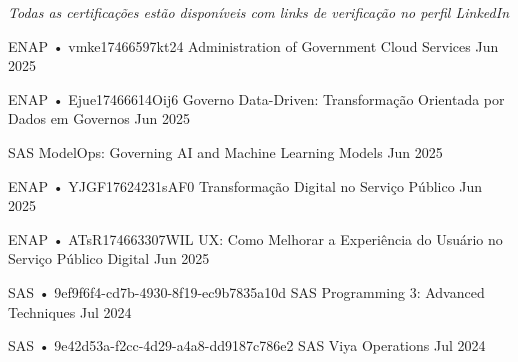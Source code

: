 
\textit{ \small Todas as certificações estão disponíveis com links de verificação no perfil LinkedIn}


\begin{cventries}

  \cventry
    {ENAP • vmke17466597kt24} %
    {Administration of Government Cloud Services} %
    {} %
    {Jun 2025} %
    {}

  \cventry
    {ENAP • Ejue17466614Oij6} %
    {Governo Data-Driven: Transformação Orientada por Dados em Governos} %
    {} %
    {Jun 2025} %
    {}

  \cventry
    {SAS} %
    {ModelOps: Governing AI and Machine Learning Models} %
    {} %
    {Jun 2025} %
    {}

  \cventry
    {ENAP • YJGF17624231sAF0} %
    {Transformação Digital no Serviço Público} %
    {} %
    {Jun 2025} %
    {}

  \cventry
    {ENAP • ATsR174663307WIL} %
    {UX: Como Melhorar a Experiência do Usuário no Serviço Público Digital} %
    {} %
    {Jun 2025} %
    {}

  \cventry
    {SAS • 9ef9f6f4-cd7b-4930-8f19-ec9b7835a10d} %
    {SAS Programming 3: Advanced Techniques} %
    {} %
    {Jul 2024} %
    {}

  \cventry
    {SAS • 9e42d53a-f2cc-4d29-a4a8-dd9187c786e2} %
    {SAS Viya Operations} %
    {} %
    {Jul 2024} %
    {}


\end{cventries}
